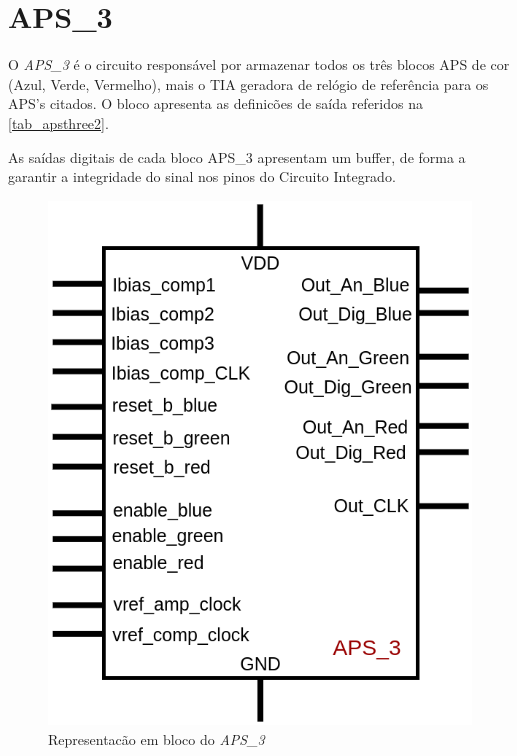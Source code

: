 \renewcommand{\NomeBloco}{\textit{APS\_3}}
\renewcommand{\NomeBlocoNoUnderline}{apsthree}
\renewcommand{\NomePTab}{tab_\NomeBlocoNoUnderline}
\renewcommand{\NomeSTab}{tab_\NomeBlocoNoUnderline2}
\renewcommand{\NomePFig}{fig_\NomeBlocoNoUnderline}
\renewcommand{\NomeSFig}{fig_\NomeBlocoNoUnderline2}
\renewcommand{\NomeTTab}{tab_\NomeBlocoNoUnderline3}
\renewcommand{\NomeQTab}{tab_\NomeBlocoNoUnderline4}

\section{APS\_3}

O \textit{\NomeBloco} \'e o circuito respons\'avel por armazenar todos os tr\^es blocos APS de cor (Azul, Verde, Vermelho), mais o TIA geradora de rel\'ogio de refer\^encia para os APS's citados. O bloco apresenta as definicões de sa\'ida referidos na \autoref{\NomeSTab}.

As sa\'idas digitais de cada bloco APS\_3 apresentam um buffer, de forma a garantir a integridade do sinal nos pinos do Circuito Integrado.

\begin{figure}[!h]
 \centering
    \centering
    \caption{\label{\NomeSFig}Representacão em bloco do \NomeBloco}
    \includegraphics[scale=0.3]{Circuitos/APS_3_block.png}
\end{figure}

